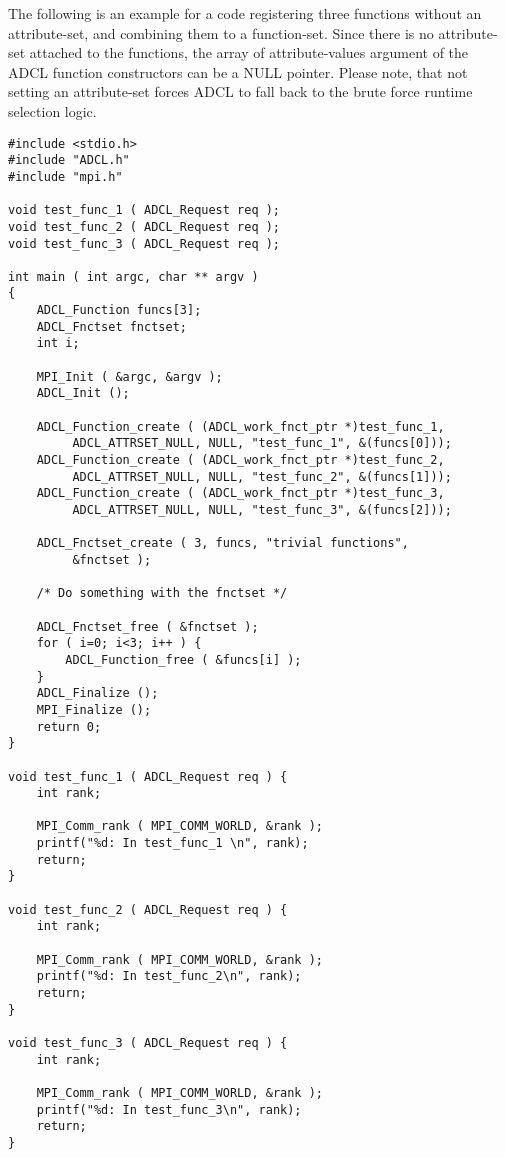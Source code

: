 The following is an example for a code registering three functions without an
attribute-set, and combining them to a function-set. Since there is no
attribute-set attached to the functions, the array of attribute-values
argument of the ADCL function constructors can be a NULL pointer. Please note,
that not setting an attribute-set forces ADCL to fall back to the brute force
runtime selection logic.
\begin{verbatim}
#include <stdio.h>
#include "ADCL.h"
#include "mpi.h"

void test_func_1 ( ADCL_Request req );
void test_func_2 ( ADCL_Request req );
void test_func_3 ( ADCL_Request req );

int main ( int argc, char ** argv ) 
{
    ADCL_Function funcs[3];
    ADCL_Fnctset fnctset;
    int i;
        
    MPI_Init ( &argc, &argv );
    ADCL_Init ();

    ADCL_Function_create ( (ADCL_work_fnct_ptr *)test_func_1, 
         ADCL_ATTRSET_NULL, NULL, "test_func_1", &(funcs[0]));
    ADCL_Function_create ( (ADCL_work_fnct_ptr *)test_func_2, 
         ADCL_ATTRSET_NULL, NULL, "test_func_2", &(funcs[1]));
    ADCL_Function_create ( (ADCL_work_fnct_ptr *)test_func_3, 
         ADCL_ATTRSET_NULL, NULL, "test_func_3", &(funcs[2]));

    ADCL_Fnctset_create ( 3, funcs, "trivial functions", 
         &fnctset );

    /* Do something with the fnctset */
    
    ADCL_Fnctset_free ( &fnctset );
    for ( i=0; i<3; i++ ) {
      	ADCL_Function_free ( &funcs[i] );
    }    
    ADCL_Finalize ();
    MPI_Finalize ();
    return 0;
}

void test_func_1 ( ADCL_Request req ) {
    int rank;
    
    MPI_Comm_rank ( MPI_COMM_WORLD, &rank );
    printf("%d: In test_func_1 \n", rank);
    return;
}

void test_func_2 ( ADCL_Request req ) {
    int rank;
    
    MPI_Comm_rank ( MPI_COMM_WORLD, &rank );
    printf("%d: In test_func_2\n", rank);
    return;
}

void test_func_3 ( ADCL_Request req ) {
    int rank;
    
    MPI_Comm_rank ( MPI_COMM_WORLD, &rank ); 
    printf("%d: In test_func_3\n", rank);
    return;
}

\end{verbatim}